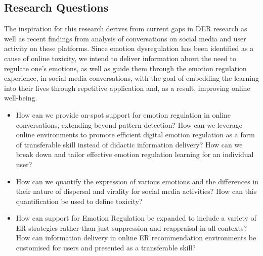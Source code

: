 \subsection{Research Questions}
The inspiration for this research derives from current gaps in DER research as well as recent findings from analysis of conversations on social media and user activity on these platforms. Since emotion dysregulation has been identified as a cause of online toxicity, we intend to deliver information about the need to regulate one's emotions, as well as guide them through the emotion regulation experience, in social media conversations, with the goal of embedding the learning into their lives through repetitive application and, as a result, improving online well-being.

\begin{itemize}
    \item How can we provide on-spot support for emotion regulation in online conversations, extending beyond pattern detection? How can we leverage online environments to promote efficient digital emotion regulation as a form of transferable skill instead of didactic information delivery? How can we break down and tailor effective emotion regulation learning for an individual user?
    \item How can we quantify the expression of various emotions and the differences in their nature of dispersal and virality for social media activities? How can this quantification be used to define toxicity?
    \item How can support for Emotion Regulation be expanded to include a variety of ER strategies rather than just suppression and reappraisal in all contexts? How can information delivery in online ER recommendation environments be customised for users and presented as a transferable skill?
\end{itemize}